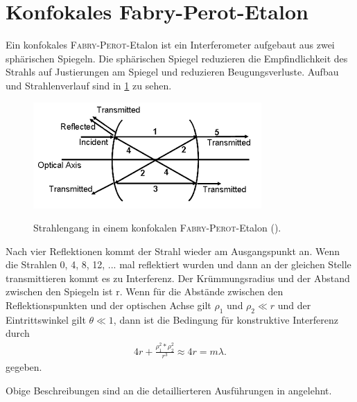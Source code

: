 \documentclass[../bericht.tex]{subfiles}
\begin{document}
    \section{Konfokales Fabry-Perot-Etalon}

      Ein konfokales \textsc{Fabry-Perot}-Etalon ist ein Interferometer aufgebaut aus zwei sphärischen Spiegeln. Die sphärischen Spiegel reduzieren die Empfindlichkeit des Strahls auf Justierungen am Spiegel und reduzieren Beugungsverluste. Aufbau und Strahlenverlauf sind in \cref{fig:fabry-perot} zu sehen.
      \begin{figure}
        \begin{center}
        \fbox
        {
          \includegraphics[angle=0, height=6 cm]{figures/fabryperot}
        }
        \caption{Strahlengang in einem konfokalen \textsc{Fabry-Perot}-Etalon (\cite{fabry-perot}).}
        \label{fig:fabry-perot}
        \end{center}
      \end{figure}
      Nach vier Reflektionen kommt der Strahl wieder am Ausgangspunkt an. Wenn die Strahlen 0, 4, 8, 12, ... mal reflektiert wurden und dann an der gleichen Stelle transmittieren kommt es zu Interferenz. Der Krümmungsradius und der Abstand zwischen den Spiegeln ist r. Wenn für die Abstände zwischen den Reflektionspunkten und der optischen Achse gilt $\rho_1$ und $\rho_2 \ll r$ und der Eintrittswinkel gilt $\theta \ll 1$, dann ist die Bedingung für konstruktive Interferenz durch
      \begin{align*}
        4r+\frac{\rho_1^2*\rho_2^2}{r^3}\approx4r=m\lambda.
      \end{align*}
      gegeben.

      Obige Beschreibungen sind an die detaillierteren Ausführungen in \cite{dem:laser} angelehnt.
\end{document}
